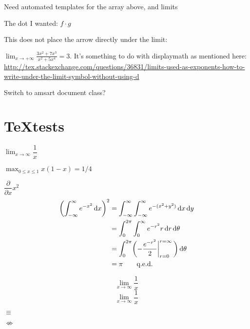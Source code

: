 \documentclass[12pt]{article}
\newcommand*\diff{\mathop{}\!\mathrm{d}}
\begin{document}
Need automated templates for the array above, and limits

The dot I wanted: $f\cdot g$

This does not place the arrow directly under the limit:


$ \lim_{x \to +\infty} \frac{3x^2 +7x^3}{x^2 +5x^4} = 3. $
It's something to do with displaymath as mentioned here:
\url{http://tex.stackexchange.com/questions/36831/limits-used-as-exponents-how-to-write-under-the-limit-symbol-without-using-d}

Switch to amsart document class?

\section{\TeX tests}

$\lim_{x\to\infty}\dfrac{1}{x}$

 $\max_{0\le x\le 1}x(1-x)=1/4$

$\dfrac{\partial}{\partial x} x^{2}$
\begin{align*}
\biggl(\int_{-\infty}^\infty e^{-x^2}\diff x\biggr)^2 
  &= \int_{-\infty}^\infty\int_{-\infty}^\infty e^{-(x^2+y^2)}\diff x\diff y \\
  &= \int_0^{2\pi}\int_0^\infty e^{-r^2}r\diff r\diff\theta                  \\
  &= \int_0^{2\pi}\biggl(-{e^{-r^2}\over2}\bigg\vert_{r=0}^{r=\infty}\,\biggr)\diff\theta\\
  &= \pi                                          \tag*{q.e.d.}
\end{align*}

\begin{equation}
  \label{eq:1}
\lim_{x\to\infty}\dfrac{1}{x}  
\end{equation}
\[ \lim_{x\to\infty}\dfrac{1}{x} \]

$\equiv$

$\not\Leftrightarrow$
\end{document}

